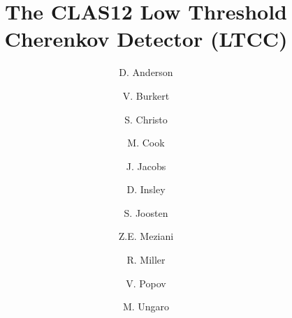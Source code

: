 \title{The CLAS12 Low Threshold Cherenkov Detector (LTCC)}

\author[A]{D. Anderson}
\author[A]{V. Burkert}
\author[A]{S. Christo}
\author[A]{M. Cook}
\author[A]{J. Jacobs}
\author[A]{D. Insley}
\author[B]{S. Joosten}
\author[B]{Z.E. Meziani}
\author[A]{R. Miller}
\author[A]{V. Popov}
\author[A]{M. Ungaro}


\address[A]{Thomas Jefferson National Accelerator Facility, Newport News, VA, USA}
\address[B]{Temple University, Philadelphia, PA, USA}
